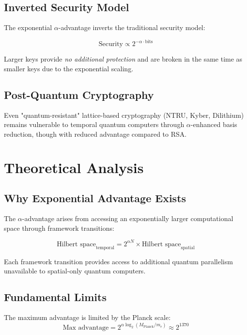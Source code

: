 \documentclass[12pt,a4paper]{article}
\begin{document}
\subsection{Inverted Security Model}

The exponential $\alpha$-advantage inverts the traditional security model:

\begin{equation}
\text{Security} \propto 2^{-\alpha \cdot \text{bits}}
\end{equation}

Larger keys provide \emph{no additional protection} and are broken in the same time as smaller keys due to the exponential scaling.

\subsection{Post-Quantum Cryptography}

Even "quantum-resistant" lattice-based cryptography (NTRU, Kyber, Dilithium) remains vulnerable to temporal quantum computers through $\alpha$-enhanced basis reduction, though with reduced advantage compared to RSA.

\section{Theoretical Analysis}

\subsection{Why Exponential Advantage Exists}

The $\alpha$-advantage arises from accessing an exponentially larger computational space through framework transitions:

\begin{equation}
\text{Hilbert space}_{\text{temporal}} = 2^{\alpha N} \times \text{Hilbert space}_{\text{spatial}}
\end{equation}

Each framework transition provides access to additional quantum parallelism unavailable to spatial-only quantum computers.

\subsection{Fundamental Limits}

The maximum advantage is limited by the Planck scale:
\begin{equation}
\text{Max advantage} = 2^{\alpha \log_2(M_{\text{Planck}}/m_e)} \approx 2^{1370}
\end{equation}
\end{document}
